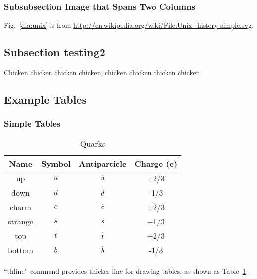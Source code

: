 \documentclass{jcse}
\begin{document}
\subsubsection{Subsubsection Image that Spans Two Columns}

\begin{figure*}
	\centering
	\caption{Evolution of Unix and Unix-like systems. This is an example
		of large figures which spans two columns.
	}
	\label{dia:unix}
\end{figure*}

Fig.~\ref{dia:unix} is from \url{http://en.wikipedia.org/wiki/File:Unix_history-simple.svg}.

\subsection{Subsection testing2}
Chicken chicken chicken chicken,
chicken chicken chicken chicken.

\subsection{Example Tables}

\subsubsection{Simple Tables}

\begin{table}
\centering
\caption{Quarks}
\label{t:quarks}
\begin{tabular}{cccc}
\thline
Name     & Symbol & Antiparticle   & Charge (e) \\
\hline
up       & $u$    & $\overline{u}$ & +2/3       \\
down     & $d$    & $\overline{d}$ & -1/3       \\
charm    & $c$    & $\overline{c}$ & +2/3       \\
strange  & $s$    & $\overline{s}$ & −1/3       \\
top      & $t$    & $\overline{t}$ & +2/3       \\
bottom   & $b$    & $\overline{b}$ & -1/3       \\
\hline
\end{tabular}
\end{table}

``thline'' command provides thicker line for drawing tables,
as shown as Table~\ref{t:quarks}.
\end{document}
